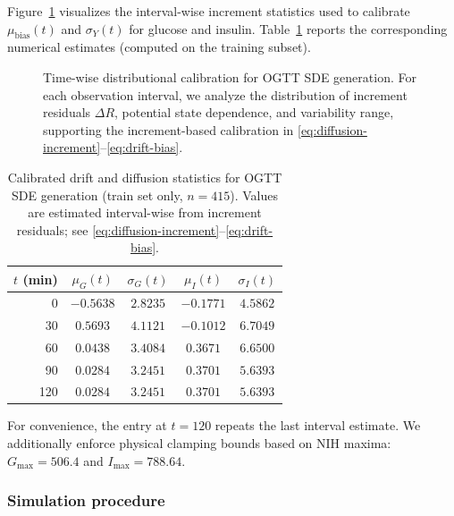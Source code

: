 Figure~\ref{fig:sde-dist-analysis} visualizes the interval-wise increment statistics used to calibrate $\mu_{\mathrm{bias}}(t)$ and $\sigma_Y(t)$
for glucose and insulin.
Table~\ref{tab:sde-calib} reports the corresponding numerical estimates (computed on the training subset).

\begin{figure}[t]
    \centering
    \caption{Time-wise distributional calibration for OGTT SDE generation.
    For each observation interval, we analyze the distribution of increment residuals $\Delta R$,
    potential state dependence, and variability range, supporting the increment-based calibration in
    \eqref{eq:diffusion-increment}--\eqref{eq:drift-bias}.}
    \label{fig:sde-dist-analysis}
\end{figure}

\begin{table}[t]
\centering
\caption{Calibrated drift and diffusion statistics for OGTT SDE generation (train set only, $n=415$).
Values are estimated interval-wise from increment residuals; see \eqref{eq:diffusion-increment}--\eqref{eq:drift-bias}.}
\label{tab:sde-calib}
\begin{tabular}{rcccc}
\hline
$t$ (min) & $\mu_G(t)$ & $\sigma_G(t)$ & $\mu_I(t)$ & $\sigma_I(t)$ \\
\hline
0   & $-0.5638$ & $2.8235$ & $-0.1771$ & $4.5862$ \\
30  & $0.5693$  & $4.1121$ & $-0.1012$ & $6.7049$ \\
60  & $0.0438$  & $3.4084$ & $0.3671$  & $6.6500$ \\
90  & $0.0284$  & $3.2451$ & $0.3701$  & $5.6393$ \\
120 & $0.0284$  & $3.2451$ & $0.3701$  & $5.6393$ \\
\hline
\end{tabular}
\end{table}

For convenience, the entry at $t=120$ repeats the last interval estimate.
We additionally enforce physical clamping bounds based on NIH maxima:
$G_{\max}=506.4$ and $I_{\max}=788.64$.

\subsubsection{Simulation procedure}
\label{subsubsec:sde-sim}


